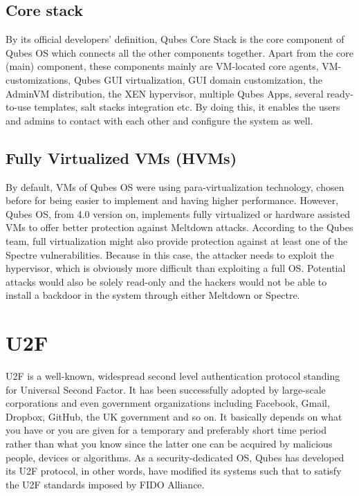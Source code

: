\documentclass[runningheads,a4paper]{article}
\begin{document}
\subsection{Core stack} 

By its official developers' definition, Qubes
Core Stack is the core component of Qubes OS which connects all the
other components together. Apart from the core (main) component, these
components mainly are VM-located core agents, VM-customizations, Qubes
GUI virtualization, GUI domain customization, the AdminVM
distribution, the XEN hypervisor, multiple Qubes Apps, several
ready-to-use templates, salt stacks integration etc.  By doing this,
it enables the users and admins to contact with each other and
configure the system as well.

\subsection{Fully Virtualized VMs (HVMs)} 

By default, VMs of Qubes OS
were using para-virtualization technology, chosen before for being
easier to implement and having higher performance. However, Qubes OS,
from 4.0 version on, implements fully virtualized or hardware assisted
VMs to offer better protection against Meltdown attacks. According to
the Qubes team, full virtualization might also provide protection
against at least one of the Spectre vulnerabilities. Because in this
case, the attacker needs to exploit the hypervisor, which is obviously
more difficult than exploiting a full OS. Potential attacks would also
be solely read-only and the hackers would not be able to install a
backdoor in the system through either Meltdown or Spectre.

\section{U2F} 

U2F is a well-known, widespread second level
authentication protocol standing for Universal Second Factor. It has
been successfully adopted by large-scale corporations and even
government organizations including Facebook, Gmail, Dropbox, GitHub,
the UK government and so on. It basically depends on what you have or
you are given for a temporary and preferably short time period rather
than what you know since the latter one can be acquired by malicious
people, devices or algorithms. As a security-dedicated OS, Qubes has
developed its U2F protocol, in other words, have modified its systems
such that to satisfy the U2F standards imposed by FIDO Alliance.
\end{document}
